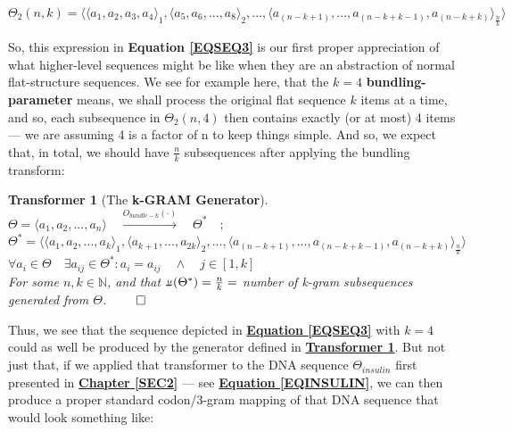 \documentclass[a4paper, 18pt]{book} %
\newtheorem{transf}{Transformer}
\newcommand{\invpi}{\rotatebox[origin=c]{180}{$\pi$}}
\begin{document}
\begin{equation}
\label{EQSEQ3}
\Theta_2(n,k) = \langle \langle a_1, a_2, a_3, a_4 \rangle_1, \langle a_5, a_6,...,a_8 \rangle_2,... , \langle a_{(n-k+1)},...,a_{(n-k+k-1)},a_{(n-k+k)}\rangle_{\frac{n}{k}} \rangle
\end{equation}

So, this expression in \textbf{Equation \ref{EQSEQ3}} is our first proper appreciation of what higher-level sequences might be like when they are an abstraction of normal flat-structure sequences. We see for example here, that the $k=4$ \textbf{bundling-parameter} means, we shall process the original flat sequence $k$ items at a time, and so, each subsequence in $\Theta_2(n,4)$ then contains exactly (or at most) 4 items --- we are assuming 4 is a factor of n to keep things simple. And so, we expect that, in total, we should have $\frac{n}{k}$ subsequences after applying the bundling transform:

\begin{transf}[The \textbf{k-GRAM Generator}]
\label{TRANSFBUND}
$\Theta = \langle a_1, a_2,...,a_n\rangle \quad \xrightarrow{O_{bundle-k}(\cdot)} \quad \Theta^* \quad;$\\
$\Theta^* = \langle \langle a_1, a_2,..., a_k \rangle_1, \langle a_{k+1},...,a_{2k} \rangle_2,... , \langle a_{(n-k+1)},...,a_{(n-k+k-1)},a_{(n-k+k)}\rangle_{\frac{n}{k}} \rangle$\\
$\forall a_i \in \Theta \quad \exists a_{ij} \in \Theta^*: a_i = a_{ij} \quad \land \quad j \in [1,k]$\\
For some $n, k \in \mathbb{N}$, and that $\invpi(\Theta^*) = \frac{n}{k} = $ number of k-gram subsequences generated from $\Theta$. $\qed$
\end{transf}


Thus, we see that the sequence depicted in \textbf{\hyperref[EQSEQ3]{Equation \ref{EQSEQ3}}} with $k=4$ could as well be produced by the generator defined in \textbf{\hyperref[TRANSFBUND]{Transformer \ref{TRANSFBUND}}}. But not just that, if we applied that transformer to the DNA sequence $\Theta_{insulin}$ first presented in \textbf{\hyperref[SEC2]{Chapter \ref{SEC2}}} --- see \textbf{\hyperref[EQINSULIN]{Equation \ref{EQINSULIN}}}, we can then produce a proper standard codon/3-gram mapping of that DNA sequence that would look something like:\\


\\
\end{document}
